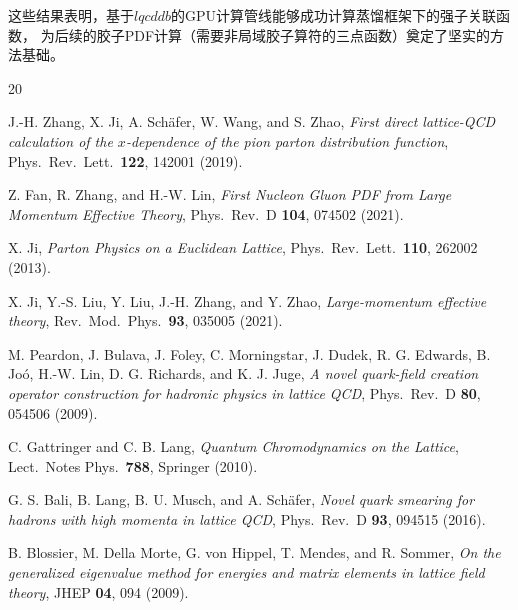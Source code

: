 \documentclass[11pt,a4paper]{article}
\begin{document}
这些结果表明，基于$lqcddb$的GPU计算管线能够成功计算蒸馏框架下的强子关联函数，
为后续的胶子PDF计算（需要非局域胶子算符的三点函数）奠定了坚实的方法基础。

\begin{thebibliography}{20}

J.-H. Zhang, X. Ji, A. Sch\"afer, W. Wang, and S. Zhao,
\textit{First direct lattice-QCD calculation of the $x$-dependence of the pion parton distribution function},
Phys.\ Rev.\ Lett.\ \textbf{122}, 142001 (2019).

Z. Fan, R. Zhang, and H.-W. Lin,
\textit{First Nucleon Gluon PDF from Large Momentum Effective Theory},
Phys.\ Rev.\ D \textbf{104}, 074502 (2021).

X. Ji,
\textit{Parton Physics on a Euclidean Lattice},
Phys.\ Rev.\ Lett.\ \textbf{110}, 262002 (2013).

X. Ji, Y.-S. Liu, Y. Liu, J.-H. Zhang, and Y. Zhao,
\textit{Large-momentum effective theory},
Rev.\ Mod.\ Phys.\ \textbf{93}, 035005 (2021).

M. Peardon, J. Bulava, J. Foley, C. Morningstar, J. Dudek, R. G. Edwards, B. Jo\'o, H.-W. Lin, D. G. Richards, and K. J. Juge,
\textit{A novel quark-field creation operator construction for hadronic physics in lattice QCD},
Phys.\ Rev.\ D \textbf{80}, 054506 (2009).

C. Gattringer and C. B. Lang,
\textit{Quantum Chromodynamics on the Lattice},
Lect.\ Notes Phys.\ \textbf{788}, Springer (2010).

G. S. Bali, B. Lang, B. U. Musch, and A. Sch\"afer,
\textit{Novel quark smearing for hadrons with high momenta in lattice QCD},
Phys.\ Rev.\ D \textbf{93}, 094515 (2016).

B. Blossier, M. Della Morte, G. von Hippel, T. Mendes, and R. Sommer,
\textit{On the generalized eigenvalue method for energies and matrix elements in lattice field theory},
JHEP \textbf{04}, 094 (2009).

\end{thebibliography}
\end{document}
